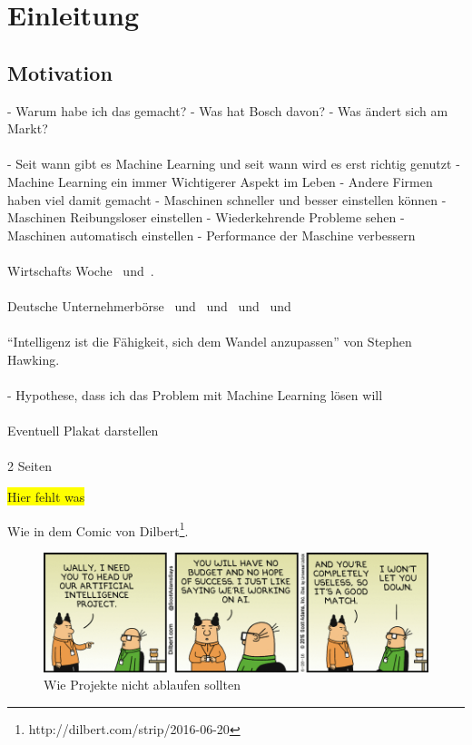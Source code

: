 \chapter{Einleitung}
\label{ch:einleitung}

\section{Motivation}
\label{sec:motivation}
- Warum habe ich das gemacht?
- Was hat Bosch davon?
- Was ändert sich am Markt?
\\ \\
- Seit wann gibt es Machine Learning und seit wann wird es erst richtig genutzt
- Machine Learning ein immer Wichtigerer Aspekt im Leben
- Andere Firmen haben viel damit gemacht
- Maschinen schneller und besser einstellen können
- Maschinen Reibungsloser einstellen
- Wiederkehrende Probleme sehen
- Maschinen automatisch einstellen
- Performance der Maschine verbessern
\\ \\
Wirtschafts Woche~\cite{article_einleitung_ww_sg} und~\cite{article_einleitung_ww_cm}.
\\ \\
Deutsche Unternehmerbörse~\cite{article_einleitung_dub_ki} und~\cite{article_einleitung_dub_aw}
und~\cite{article_einleitung_dub_jb} und~\cite{article_einleitung_dub_sb} und~\cite{article_einleitung_dub_il}
\\ \\
\enquote{Intelligenz ist die Fähigkeit, sich dem Wandel anzupassen} von Stephen Hawking.
\\ \\
- Hypothese, dass ich das Problem mit Machine Learning lösen will
\\ \\
Eventuell Plakat darstellen
\\ \\
2 Seiten

\colorbox{yellow}{Hier fehlt was}

Wie in dem Comic von Dilbert\footnote{http://dilbert.com/strip/2016-06-20}.

\begin{figure}[h]
    \centering
    \includegraphics[width=\textwidth]{images/kapitel_1/dilbert_ai.png}
    \caption{Wie Projekte nicht ablaufen sollten}
    \label{fig:dilbert_ai}
\end{figure}

